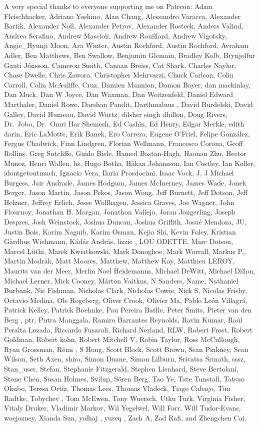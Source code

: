 \documentclass[
  letterpaper,
  DIV=11,
  numbers=noendperiod]{scrartcl}
\begin{document}
A very special thanks to everyone supporting me on Patreon: Adam
Fleischhacker, Adriano Yoshino, Alan Chang, Alessandro Varacca,
Alexander Bartik, Alexander Noll, Alexander Petrov, Alexander Rosteck,
Anders Valind, Andrea Serafino, Andrew Mascioli, Andrew Rouillard,
Andrew Vigotsky, Angie\_Hyunji Moon, Ara Winter, Austin Rochford, Austin
Rochford, Avraham Adler, Ben Matthews, Ben Swallow, Benjamin Glemain,
Bradley Kolb, Brynjolfur Gauti Jónsson, Cameron Smith, Canaan Breiss,
Cat Shark, Charles Naylor, Chase Dwelle, Chris Zawora, Christopher
Mehrvarzi, Chuck Carlson, Colin Carroll, Colin McAuliffe, Cruz, Damien
Mannion, Damon Bayer, dan mackinlay, Dan Muck, Dan W Joyce, Dan Waxman,
Dan Weitzenfeld, Daniel Edward Marthaler, Daniel Rowe, Darshan Pandit,
Darthmaluus , David Burdelski, David Galley, David Humeau, David Wurtz,
dilsher singh dhillon, Doug Rivers, Dr.~Jobo, Dr.~Omri Har Shemesh, Ed
Cashin, Ed Henry, Edgar Merkle, edith darin, Eric LaMotte, Erik Banek,
Ero Carrera, Eugene O'Friel, Felipe González, Fergus Chadwick, Finn
Lindgren, Florian Wellmann, Francesco Corona, Geoff Rollins, Greg
Sutcliffe, Guido Biele, Hamed Bastan-Hagh, Haonan Zhu, Hector Munoz,
Henri Wallen, hs, Hugo Botha, Håkan Johansson, Ian Costley, Ian Koller,
idontgetoutmuch, Ignacio Vera, Ilaria Prosdocimi, Isaac Vock, J, J
Michael Burgess, Jair Andrade, James Hodgson, James McInerney, James
Wade, Janek Berger, Jason Martin, Jason Pekos, Jason Wong, Jeff Burnett,
Jeff Dotson, Jeff Helzner, Jeffrey Erlich, Jesse Wolfhagen, Jessica
Graves, Joe Wagner, John Flournoy, Jonathan H. Morgan, Jonathon Vallejo,
Joran Jongerling, Joseph Despres, Josh Weinstock, Joshua Duncan, Joshua
Griffith, Josué Mendoza, JU, Justin Bois, Karim Naguib, Karim Osman,
Kejia Shi, Kevin Foley, Kristian Gårdhus Wichmann, Kádár András, lizzie
, LOU ODETTE, Marc Dotson, Marcel Lüthi, Marek Kwiatkowski, Mark
Donoghoe, Mark Worrall, Markus P., Martin Modrák, Matt Moores, Matthew,
Matthew Kay, Matthieu LEROY, Maurits van der Meer, Merlin Noel
Heidemanns, Michael DeWitt, Michael Dillon, Michael Lerner, Mick Cooney,
Márton Vaitkus, N Sanders, Name, Nathaniel Burbank, Nic Fishman,
Nicholas Clark, Nicholas Cowie, Nick S, Nicolas Frisby, Octavio Medina,
Ole Rogeberg, Oliver Crook, Olivier Ma, Pablo León Villagrá, Patrick
Kelley, Patrick Boehnke, Pau Pereira Batlle, Peter Smits, Pieter van den
Berg , ptr, Putra Manggala, Ramiro Barrantes Reynolds, Ravin Kumar, Raúl
Peralta Lozada, Riccardo Fusaroli, Richard Nerland, RLW, Robert Frost,
Robert Goldman, Robert kohn, Robert Mitchell V, Robin Taylor, Ross
McCullough, Ryan Grossman, Rémi , S Hong, Scott Block, Scott Brown, Sean
Pinkney, Sean Wilson, Seth Axen, shira, Simon Duane, Simon Lilburn,
Srivatsa Srinath, sssz, Stan\_user, Stefan, Stephanie Fitzgerald,
Stephen Lienhard, Steve Bertolani, Stone Chen, Susan Holmes, Svilup,
Sören Berg, Tao Ye, Tate Tunstall, Tatsuo Okubo, Teresa Ortiz, Thomas
Lees, Thomas Vladeck, Tiago Cabaço, Tim Radtke, Tobychev , Tom McEwen,
Tony Wuersch, Utku Turk, Virginia Fisher, Vitaly Druker, Vladimir
Markov, Wil Yegelwel, Will Farr, Will Tudor-Evans, woejozney, Xianda
Sun, yolhaj , yureq , Zach A, Zad Rafi, and Zhengchen Cai.
\end{document}
